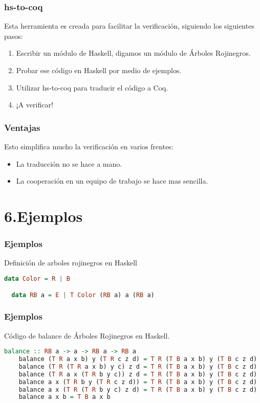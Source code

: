 \documentclass[xcolor=dvipsnames,table,handout]{beamer}
\begin{document}
\begin{frame}
  \frametitle{hs-to-coq}
        Esta herramienta es creada para facilitar la verificación, siguiendo los
siguientes pasos:
        \begin{enumerate}
            \item Escribir un módulo de Haskell, digamos un módulo de Árboles
Rojinegros.
            \item Probar ese código en Haskell por medio de ejemplos.
            \item Utilizar hs-to-coq para traducir el código a Coq.
            \item ¡A verificar!
        \end{enumerate}
\end{frame}


\begin{frame}[fragile]
  \frametitle{Ventajas}
        Esto simplifica mucho la verificación en varios frentes:
         \begin{itemize}
            \item La traducción no se hace a mano.
            \item La cooperación en un equipo de trabajo se hace mas sencilla.
        \end{itemize}
\end{frame}
\section{6.Ejemplos}

\begin{frame}[fragile]
  \frametitle{Ejemplos}

  Definición de arboles rojinegros en Haskell
  \begin{lstlisting}[language=haskell]
  data Color = R | B

  data RB a = E | T Color (RB a) a (RB a)
  \end{lstlisting}

\end{frame}


\begin{frame}[fragile]
  \frametitle{Ejemplos}
  Código de balance de Árboles Rojinegros en Haskell.
       \begin{lstlisting}[language=haskell]
    balance :: RB a -> a -> RB a -> RB a
    balance (T R a x b) y (T R c z d) = T R (T B a x b) y (T B c z d)
    balance (T R (T R a x b) y c) z d = T R (T B a x b) y (T B c z d)
    balance (T R a x (T R b y c)) z d = T R (T B a x b) y (T B c z d)
    balance a x (T R b y (T R c z d)) = T R (T B a x b) y (T B c z d)
    balance a x (T R (T R b y c) z d) = T R (T B a x b) y (T B c z d)
    balance a x b = T B a x b
       \end{lstlisting}
\end{frame}
\end{document}
